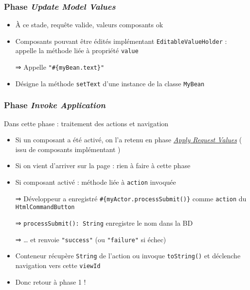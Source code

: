 \documentclass[english, french]{beamer}
\begin{document}
\begin{frame}[label=ph-umv]
	\frametitle{Phase \emph{Update Model Values}}
	\begin{itemize}
		\item À ce stade, requête valide, valeurs composants ok
		\item Composants pouvant être édités {\tiny implémentant \texttt{EditableValueHolder}} : appelle la méthode liée à propriété \texttt{value}
		\item[⇒] Appelle \texttt{"\#\{myBean.text\}"}
		\item Désigne la méthode \texttt{setText} d’une instance de la classe \texttt{MyBean}
	\end{itemize}
\end{frame}

\begin{frame}[label=ph-ia]
	\frametitle{Phase \emph{Invoke Application}}
	Dans cette phase : traitement des actions et navigation
	\begin{itemize}
		\item Si un composant a été activé, on l’a retenu en phase \hyperlink{ph-arv}{\emph{Apply Request Values}} {\tiny ( issu de composants implémentant )}
		\item Si on vient d’arriver sur la page : rien à faire à cette phase
		\item Si composant activé : méthode liée à \texttt{action} invoquée
		\item[⇒] Développeur a enregistré \texttt{\#\{myActor.processSubmit()\}} comme \texttt{action} du \texttt{HtmlCommandButton}
		\item[⇒] \texttt{processSubmit(): String} enregistre le nom dans la BD
		\item[⇒] … et renvoie \texttt{"success"} (ou \texttt{"failure"} si échec)
		\item Conteneur récupère \texttt{String} de l’action {\tiny ou invoque \texttt{toString()}} et déclenche navigation vers cette \texttt{viewId}
		\item Donc \alert{retour à phase 1 !}
	\end{itemize}
\end{frame}
\end{document}
